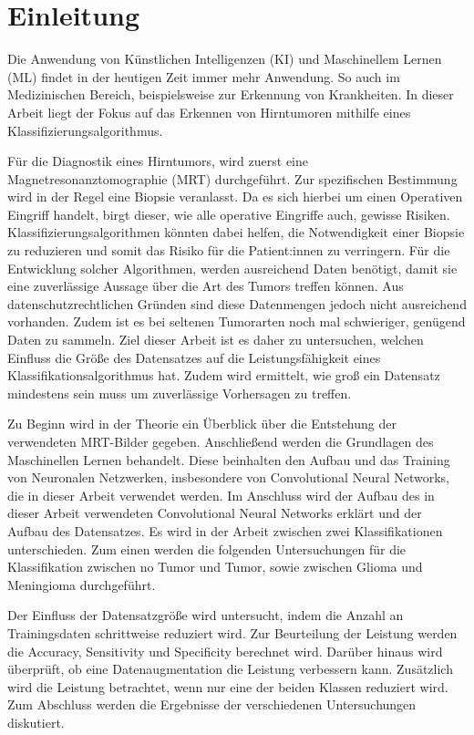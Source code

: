 \chapter{Einleitung}

Die Anwendung von Künstlichen Intelligenzen (KI) und Maschinellem Lernen (ML) findet in der heutigen Zeit immer mehr Anwendung.
So auch im Medizinischen Bereich, beispielsweise zur Erkennung von Krankheiten.
In dieser Arbeit liegt der Fokus auf das Erkennen von Hirntumoren mithilfe eines Klassifizierungsalgorithmus.

Für die Diagnostik eines Hirntumors, wird zuerst eine Magnetresonanztomographie (MRT) durchgeführt.
Zur spezifischen Bestimmung wird in der Regel eine Biopsie veranlasst.
Da es sich hierbei um einen Operativen Eingriff handelt, birgt dieser, wie alle operative Eingriffe auch, gewisse Risiken.
Klassifizierungsalgorithmen könnten dabei helfen, die Notwendigkeit einer Biopsie zu reduzieren und somit das Risiko für die Patient:innen zu verringern.
Für die Entwicklung solcher Algorithmen, werden ausreichend Daten benötigt, damit sie eine zuverlässige Aussage über die Art des Tumors treffen können. 
Aus datenschutzrechtlichen Gründen sind diese Datenmengen jedoch nicht ausreichend vorhanden. 
Zudem ist es bei seltenen Tumorarten noch mal schwieriger, genügend Daten zu sammeln.
Ziel dieser Arbeit ist es daher zu untersuchen, welchen Einfluss die Größe des Datensatzes auf die Leistungsfähigkeit eines Klassifikationsalgorithmus hat. 
Zudem wird ermittelt, wie groß ein Datensatz mindestens sein muss um zuverlässige Vorhersagen zu treffen.

Zu Beginn wird in der Theorie ein Überblick über die Entstehung der verwendeten MRT-Bilder gegeben. 
Anschließend werden die Grundlagen des Maschinellen Lernen behandelt.
Diese beinhalten den Aufbau und das Training von Neuronalen Netzwerken, insbesondere von Convolutional Neural Networks, die in dieser Arbeit verwendet werden.
Im Anschluss wird der Aufbau des in dieser Arbeit verwendeten Convolutional Neural Networks erklärt und der Aufbau des Datensatzes. 
Es wird in der Arbeit zwischen zwei Klassifikationen unterschieden. 
Zum einen werden die folgenden Untersuchungen für die Klassifikation zwischen no Tumor und Tumor, sowie zwischen Glioma und Meningioma durchgeführt.

Der Einfluss der Datensatzgröße wird untersucht, indem die Anzahl an Trainingsdaten schrittweise reduziert wird.
Zur Beurteilung der Leistung werden die Accuracy, Sensitivity und Specificity berechnet wird. 
Darüber hinaus wird überprüft, ob eine Datenaugmentation die Leistung verbessern kann.
Zusätzlich wird die Leistung betrachtet, wenn nur eine der beiden Klassen reduziert wird. 
Zum Abschluss werden die Ergebnisse der verschiedenen Untersuchungen diskutiert.